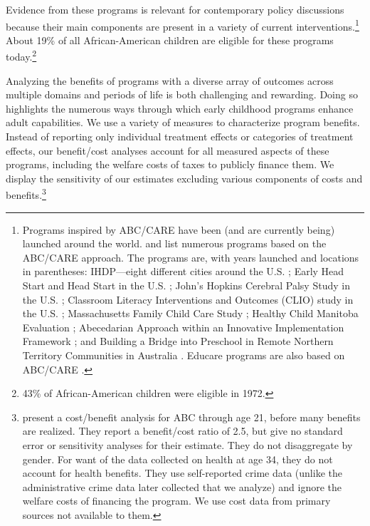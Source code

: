 Evidence from these programs is relevant for contemporary policy discussions because their main components are present in a variety of current interventions.\footnote{Programs inspired by ABC/CARE have been (and are currently being) launched around the world. \citet{Sparling_2010_Highlights} and \citet{Ramey_Ramey_Lanzi_2014_Interventions} list numerous programs based on the ABC/CARE approach. The programs are, with years launched and locations in parentheses: IHDP---eight different cities around the U.S. \citep{Spiker-etal_1997_Helping}; Early Head Start and Head Start in the U.S. \citep{Schneider_McDonald-eds_2007_Scale-Up_Vol-1}; John's Hopkins Cerebral Palsy Study in the U.S. \citep{Sparling_2010_Highlights}; Classroom Literacy Interventions and Outcomes (CLIO) study in the U.S. \citep{Sparling_2010_Highlights}; Massachusetts Family Child Care Study \citep{Collins_etal_2010_Massachusetts-Study}; Healthy Child Manitoba Evaluation \citep{Healthy_Child_Manitoba_2015_Starting-Early}; Abecedarian Approach within an Innovative Implementation Framework \citep{Jensen_Nielsen_2016_ABC-Programme-Pilot}; and Building a Bridge into Preschool in Remote Northern Territory Communities in Australia \citep{UMonash_Dataset_2015_URL}. Educare programs are also based on ABC/CARE \citep{Educare_2014_Research_Agenda,Yazejian_Bryant_2012_Educare}.} About 19\% of all African-American children are eligible for these programs today.\footnote{43\% of African-American children were eligible in 1972.}

Analyzing the benefits of programs with a diverse array of outcomes across multiple domains and periods of life is both challenging and rewarding. Doing so highlights the numerous ways through which early childhood programs enhance adult capabilities. We use a variety of measures to characterize program benefits. Instead of reporting only individual treatment effects or categories of treatment effects, our benefit/cost analyses account for all measured aspects of these programs, including the welfare costs of taxes to publicly finance them. We display the sensitivity of our estimates excluding various components of costs and benefits.\footnote{\cite{Barnett_Masse_2002_benefitcost,Barnett_Masse_2007_EER} present a cost/benefit analysis for ABC through age 21, before many benefits are realized. They report a benefit/cost ratio of 2.5, but give no standard error or sensitivity analyses for their estimate. They do not disaggregate by gender. For want of the data collected on health at age 34, they do not account for health benefits. They use self-reported crime data (unlike the administrative crime data later collected that we analyze) and ignore the welfare costs of financing the program. We use cost data from primary sources not available to them.}


